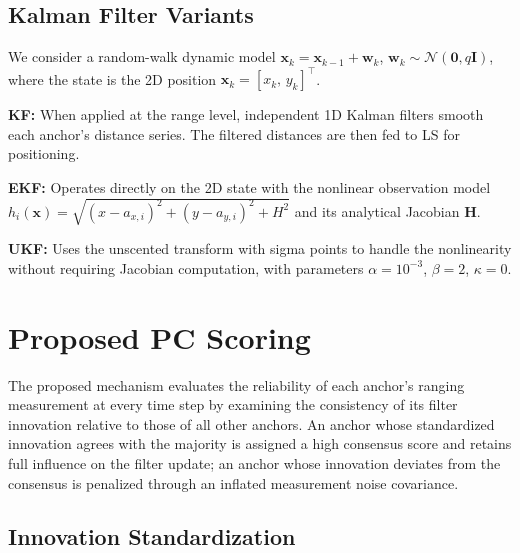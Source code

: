\documentclass[journal]{IEEEtran}
\newcommand{\mbf}[1]{\mathbf{#1}}
\begin{document}
\subsection{Kalman Filter Variants}

We consider a random-walk dynamic model $\mbf{x}_{k} = \mbf{x}_{k-1} + \mbf{w}_k$, $\mbf{w}_k \sim \mathcal{N}(\mbf{0}, q\mbf{I})$, where the state is the 2D position $\mbf{x}_k = [x_k,\, y_k]^\top$.

\textbf{KF:} When applied at the range level, independent 1D Kalman filters smooth each anchor's distance series. The filtered distances are then fed to LS for positioning.

\textbf{EKF:} Operates directly on the 2D state with the nonlinear observation model $h_i(\mbf{x}) = \sqrt{(x-a_{x,i})^2 + (y-a_{y,i})^2 + H^2}$ and its analytical Jacobian $\mbf{H}$.

\textbf{UKF:} Uses the unscented transform with sigma points to handle the nonlinearity without requiring Jacobian computation, with parameters $\alpha=10^{-3}$, $\beta=2$, $\kappa=0$.


\section{Proposed PC Scoring}

The proposed mechanism evaluates the reliability of each anchor's ranging measurement at every time step by examining the consistency of its filter innovation relative to those of all other anchors. An anchor whose standardized innovation agrees with the majority is assigned a high consensus score and retains full influence on the filter update; an anchor whose innovation deviates from the consensus is penalized through an inflated measurement noise covariance.

\subsection{Innovation Standardization}
\end{document}
